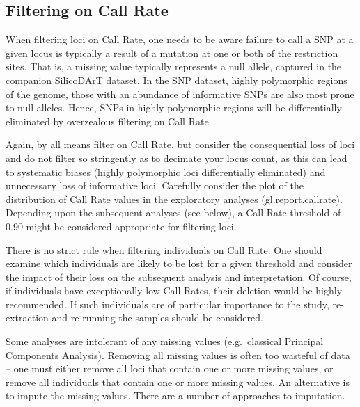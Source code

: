 \documentclass[
  letterpaper,
  DIV=11,
  numbers=noendperiod]{scrreprt}
\begin{document}
\hypertarget{filtering-on-call-rate-1}{%
\subsection{Filtering on Call Rate}\label{filtering-on-call-rate-1}}

When filtering loci on Call Rate, one needs to be aware failure to call
a SNP at a given locus is typically a result of a mutation at one or
both of the restriction sites. That is, a missing value typically
represents a null allele, captured in the companion SilicoDArT dataset.
In the SNP dataset, highly polymorphic regions of the genome, those with
an abundance of informative SNPs are also most prone to null alleles.
Hence, SNPs in highly polymorphic regions will be differentially
eliminated by overzealous filtering on Call Rate.

Again, by all means filter on Call Rate, but consider the consequential
loss of loci and do not filter so stringently as to decimate your locus
count, as this can lead to systematic biases (highly polymorphic loci
differentially eliminated) and unnecessary loss of informative loci.
Carefully consider the plot of the distribution of Call Rate values in
the exploratory analyses (gl.report.callrate). Depending upon the
subsequent analyses (see below), a Call Rate threshold of 0.90 might be
considered appropriate for filtering loci.

There is no strict rule when filtering individuals on Call Rate. One
should examine which individuals are likely to be lost for a given
threshold and consider the impact of their loss on the subsequent
analysis and interpretation. Of course, if individuals have
exceptionally low Call Rates, their deletion would be highly
recommended. If such individuals are of particular importance to the
study, re-extraction and re-running the samples should be considered.

Some analyses are intolerant of any missing values (e.g.~classical
Principal Components Analysis). Removing all missing values is often too
wasteful of data -- one must either remove all loci that contain one or
more missing values, or remove all individuals that contain one or more
missing values. An alternative is to impute the missing values. There
are a number of approaches to imputation.
\end{document}
